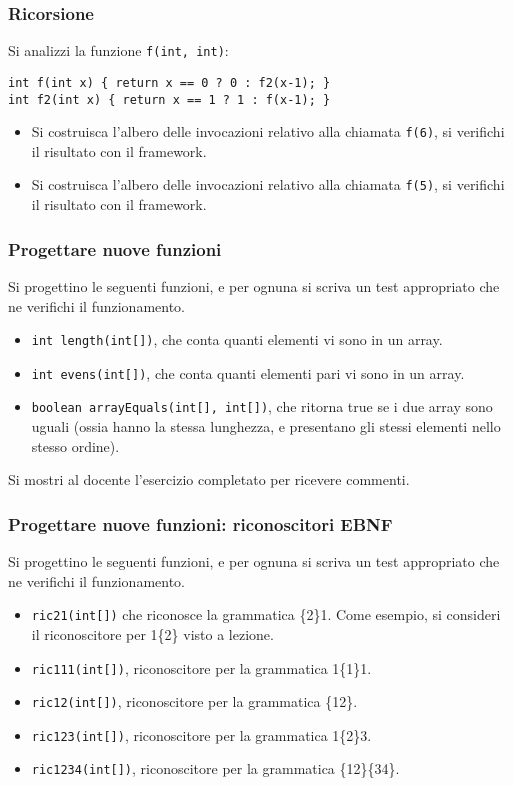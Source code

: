 \documentclass{beamer}
\begin{document}
\begin{frame}[fragile]
\frametitle{Ricorsione}
Si analizzi la funzione \texttt{f(int, int)}:
\begin{verbatim}
int f(int x) { return x == 0 ? 0 : f2(x-1); }
int f2(int x) { return x == 1 ? 1 : f(x-1); }
\end{verbatim}
\begin{itemize}
 \item Si costruisca l'albero delle invocazioni relativo alla chiamata \texttt{f(6)}, si verifichi il risultato con il framework.
 \item Si costruisca l'albero delle invocazioni relativo alla chiamata \texttt{f(5)}, si verifichi il risultato con il framework. 
\end{itemize}
\end{frame}

\begin{frame}[fragile]
\frametitle{Progettare nuove funzioni}
Si progettino le seguenti funzioni, e per ognuna si scriva un test appropriato che ne verifichi il funzionamento.
\begin{itemize}
 \item \texttt{int length(int[])}, che conta quanti elementi vi sono in un array.
 \item \texttt{int evens(int[])}, che conta quanti elementi pari vi sono in un array.
 \item \texttt{boolean arrayEquals(int[], int[])}, che ritorna true se i due array sono uguali (ossia hanno la stessa lunghezza, e presentano gli stessi elementi nello stesso ordine).
\end{itemize}
Si mostri al docente l'esercizio completato per ricevere commenti.
\end{frame}

\begin{frame}[fragile]
\frametitle{Progettare nuove funzioni: riconoscitori EBNF}
Si progettino le seguenti funzioni, e per ognuna si scriva un test appropriato che ne verifichi il funzionamento.
\begin{itemize}
 \item \texttt{ric21(int[])} che riconosce la grammatica \{2\}1. Come esempio, si consideri il riconoscitore per 1\{2\} visto a lezione.
 \item \texttt{ric111(int[])}, riconoscitore per la grammatica 1\{1\}1.
 \item \texttt{ric12(int[])}, riconoscitore per la grammatica \{1\textbar{}2\}.
 \item \texttt{ric123(int[])}, riconoscitore per la grammatica 1\{2\}3.
 \item \texttt{ric1234(int[])}, riconoscitore per la grammatica \{1\textbar{}2\}\{3\textbar{}4\}.
\end{itemize}
\end{frame}
\end{document}
